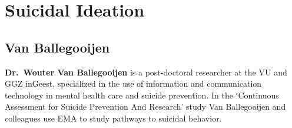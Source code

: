 \documentclass[]{book}
\begin{document}
\section{Suicidal Ideation}\label{suicidal-ideation}

\subsection{Van Ballegooijen}\label{van-ballegooijen}

 

\textbf{Dr.~Wouter Van Ballegooijen} is a post-doctoral researcher at
the VU and GGZ inGeest, specialized in the use of information and
communication technology in mental health care and suicide prevention.
In the `Continuous Assessment for Suicide Prevention And Research' study
\citep[\emph{CASPAR};][]{Nuij2018} Van Ballegooijen and colleagues use
EMA to study pathways to suicidal behavior.
\end{document}
